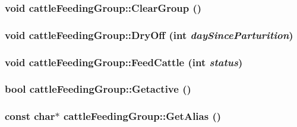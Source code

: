 \label{classcattle_feeding_group_a620bdb68d80e077f170ea3086c15c9b6}
\hypertarget{classcattle_feeding_group_a316f768cdd74f27d1e09368264b9bbf6}{
\subsubsection[{ClearGroup}]{\setlength{\rightskip}{0pt plus 5cm}void cattleFeedingGroup::ClearGroup ()}}
\label{classcattle_feeding_group_a316f768cdd74f27d1e09368264b9bbf6}
\hypertarget{classcattle_feeding_group_a6b69cca3e3f6fd7f67fb691874aea2bb}{
\subsubsection[{DryOff}]{\setlength{\rightskip}{0pt plus 5cm}void cattleFeedingGroup::DryOff (int {\em daySinceParturition})}}
\label{classcattle_feeding_group_a6b69cca3e3f6fd7f67fb691874aea2bb}
\hypertarget{classcattle_feeding_group_ad2bf7d9b8bedfc9c9bb2d3b56cbaaaab}{
\subsubsection[{FeedCattle}]{\setlength{\rightskip}{0pt plus 5cm}void cattleFeedingGroup::FeedCattle (int {\em status})}}
\label{classcattle_feeding_group_ad2bf7d9b8bedfc9c9bb2d3b56cbaaaab}
\hypertarget{classcattle_feeding_group_af1702dff1ca9254e2b31a20fded5b85d}{
\subsubsection[{Getactive}]{\setlength{\rightskip}{0pt plus 5cm}bool cattleFeedingGroup::Getactive ()}}
\label{classcattle_feeding_group_af1702dff1ca9254e2b31a20fded5b85d}
\hypertarget{classcattle_feeding_group_a0b0c7cb1e42ad2196c20d2d2e27425e8}{
\subsubsection[{GetAlias}]{\setlength{\rightskip}{0pt plus 5cm}const char$\ast$ cattleFeedingGroup::GetAlias ()}}
